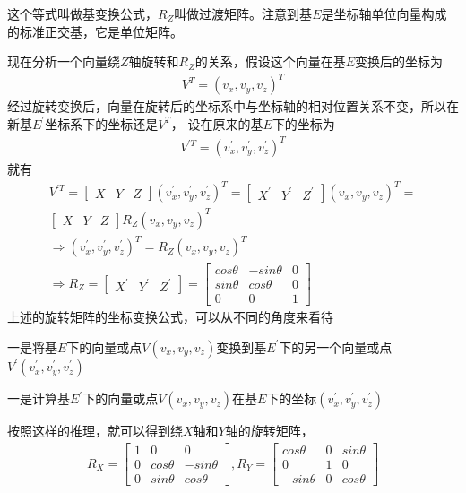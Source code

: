 这个等式叫做基变换公式，$R_{Z}$叫做过渡矩阵。注意到基$E$是坐标轴单位向量构成的标准正交基，它是单位矩阵。
\par
现在分析一个向量绕$Z$轴旋转和$R_{Z}$的关系，假设这个向量在基$E$变换后的坐标为
\begin{gather*}
    V^{T} = (v_{x}, v_{y}, v_{z})^{T}
\end{gather*}
经过旋转变换后，向量在旋转后的坐标系中与坐标轴的相对位置关系不变，所以在新基$E^{'}$坐标系下的坐标还是$V^{T}$，
设在原来的基$E$下的坐标为 
\begin{gather*}
    V^{'T} = (v_{x}^{'}, v_{y}^{'}, v_{z}^{'})^{T}
\end{gather*}
就有
\begin{gather*}
    V^{'T} = 
    \begin{bmatrix}
        X & Y & Z
    \end{bmatrix} (v_{x}^{'}, v_{y}^{'}, v_{z}^{'})^{T} = 
    \begin{bmatrix}
        X^{'} & Y^{'} & Z^{'}
    \end{bmatrix} (v_{x}, v_{y}, v_{z})^{T} = \\
    \begin{bmatrix}
        X & Y & Z
    \end{bmatrix} R_{Z} (v_{x}, v_{y}, v_{z})^{T} \\
    \Rightarrow (v_{x}^{'}, v_{y}^{'}, v_{z}^{'})^{T} = R_{Z} (v_{x}, v_{y}, v_{z})^{T} \\
    \Rightarrow R_{Z} =  
    \begin{bmatrix}
        X^{'} & Y^{'} & Z^{'}
    \end{bmatrix} = 
    \begin{bmatrix}
        cos\theta & -sin\theta & 0 \\
        sin\theta & cos\theta & 0 \\
        0 & 0 & 1
    \end{bmatrix}
\end{gather*}
上述的旋转矩阵的坐标变换公式，可以从不同的角度来看待
\par
一是将基$E$下的向量或点$V(v_{x}, v_{y}, v_{z})$变换到基$E^{'}$下的另一个向量或点$V^{'}(v_{x}^{'}, v_{y}^{'}, v_{z}^{'})$
\par
一是计算基$E^{'}$下的向量或点$V(v_{x}, v_{y}, v_{z})$在基$E$下的坐标$(v_{x}^{'}, v_{y}^{'}, v_{z}^{'})$
\par
按照这样的推理，就可以得到绕$X$轴和$Y$轴的旋转矩阵，
\begin{gather*}
    R_{X} = 
    \begin{bmatrix}
        1 & 0 & 0 \\
        0 & cos\theta & -sin\theta \\
        0 & sin\theta & cos\theta 
    \end{bmatrix},  
    R_{Y} = 
    \begin{bmatrix}
        cos\theta & 0 & sin\theta \\
        0 & 1 & 0 \\
        -sin\theta & 0 & cos\theta 
    \end{bmatrix}
\end{gather*}

